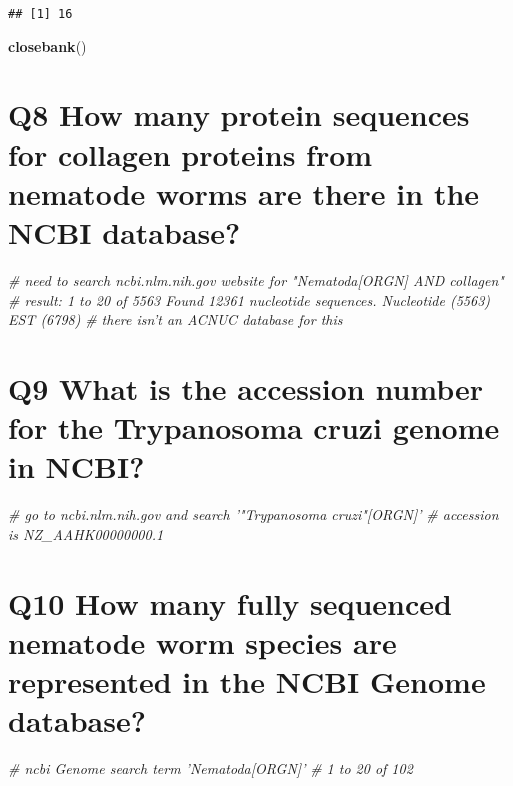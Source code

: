 \documentclass[]{article}
\newenvironment{Shaded}{\begin{snugshade}}{\end{snugshade}}
\newcommand{\KeywordTok}[1]{\textcolor[rgb]{0.13,0.29,0.53}{\textbf{#1}}}
\newcommand{\CommentTok}[1]{\textcolor[rgb]{0.56,0.35,0.01}{\textit{#1}}}
\newcommand{\NormalTok}[1]{#1}
\begin{document}
\begin{verbatim}
## [1] 16
\end{verbatim}

\begin{Shaded}
\begin{Highlighting}[]
\KeywordTok{closebank}\NormalTok{()}
\end{Highlighting}
\end{Shaded}

\section{Q8 How many protein sequences for collagen proteins from
nematode worms are there in the NCBI
database?}\label{q8-how-many-protein-sequences-for-collagen-proteins-from-nematode-worms-are-there-in-the-ncbi-database}

\begin{Shaded}
\begin{Highlighting}[]
\CommentTok{# need to search ncbi.nlm.nih.gov website for "Nematoda[ORGN] AND collagen"}
\CommentTok{# result: 1 to 20 of 5563 Found 12361 nucleotide sequences. Nucleotide (5563) EST (6798)}
\CommentTok{# there isn't an ACNUC database for this}
\end{Highlighting}
\end{Shaded}

\section{Q9 What is the accession number for the Trypanosoma cruzi
genome in
NCBI?}\label{q9-what-is-the-accession-number-for-the-trypanosoma-cruzi-genome-in-ncbi}

\begin{Shaded}
\begin{Highlighting}[]
\CommentTok{# go to ncbi.nlm.nih.gov and search '"Trypanosoma cruzi"[ORGN]'}
\CommentTok{# accession is NZ_AAHK00000000.1}
\end{Highlighting}
\end{Shaded}

\section{Q10 How many fully sequenced nematode worm species are
represented in the NCBI Genome
database?}\label{q10-how-many-fully-sequenced-nematode-worm-species-are-represented-in-the-ncbi-genome-database}

\begin{Shaded}
\begin{Highlighting}[]
\CommentTok{# ncbi Genome search term 'Nematoda[ORGN]'}
\CommentTok{# 1 to 20 of 102}
\end{Highlighting}
\end{Shaded}
\end{document}
